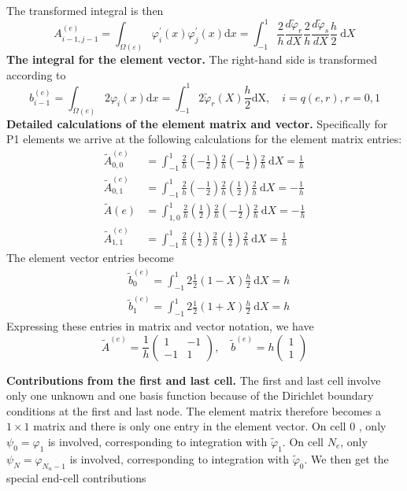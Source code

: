 \documentclass[../main.tex]{subfiles}
\begin{document}
	\noindent The transformed integral is then
	$$
	A_{i-1, j-1}^{(e)}=\int_{\Omega(\varepsilon)} \varphi_{i}^{\prime}(x) \varphi_{j}^{\prime}(x) \mathrm{d} x=\int_{-1}^{1} \frac{2}{h} \frac{d \tilde{\varphi}_{r}}{d X} \frac{2}{h} \frac{d \tilde{\varphi}_{s}}{d X} \frac{h}{2} \mathrm{~d} X
	$$
	\textbf{The integral for the element vector.  } The right-hand side is transformed according to
	$$
	b_{i-1}^{(e)}=\int_{\Omega(e)} 2 \varphi_{i}(x) \mathrm{d} x=\int_{-1}^{1} 2 \tilde{\varphi}_{r}(X) \frac{h}{2} \mathrm{dX}, \quad i=q(e, r), r=0,1
	$$
	\textbf{Detailed calculations of the element matrix and vector.   } Specifically for P1 elements we arrive at the following calculations for the element matrix entries:
	$$
	\begin{aligned}
		\tilde{A}_{0,0}^{(e)} &=\int_{-1}^{1} \frac{2}{h}\left(-\frac{1}{2}\right) \frac{2}{h}\left(-\frac{1}{2}\right) \frac{2}{h} \mathrm{~d} X=\frac{1}{h} \\
		\tilde{A}_{0,1}^{(e)} &=\int_{-1}^{1} \frac{2}{h}\left(-\frac{1}{2}\right) \frac{2}{h}\left(\frac{1}{2}\right) \frac{2}{h} \mathrm{~d} X=-\frac{1}{h} \\
		\tilde{A}(e) &=\int_{1,0}^{1} \frac{2}{h}\left(\frac{1}{2}\right) \frac{2}{h}\left(-\frac{1}{2}\right) \frac{2}{h} \mathrm{~d} X=-\frac{1}{h} \\
		\tilde{A}_{1,1}^{(e)} &=\int_{-1}^{1} \frac{2}{h}\left(\frac{1}{2}\right) \frac{2}{h}\left(\frac{1}{2}\right) \frac{2}{h} \mathrm{~d} X=\frac{1}{h}
	\end{aligned}
	$$
	The element vector entries become
	$$
	\begin{aligned}
		&\tilde{b}_{0}^{(e)}=\int_{-1}^{1} 2 \frac{1}{2}(1-X) \frac{h}{2} \mathrm{~d} X=h \\
		&\tilde{b}_{1}^{(e)}=\int_{-1}^{1} 2 \frac{1}{2}(1+X) \frac{h}{2} \mathrm{~d} X=h
	\end{aligned}
	$$
	Expressing these entries in matrix and vector notation, we have
	\begin{equation}
			\label{eqa177}
		\tilde{A}^{(e)}=\frac{1}{h}\left(\begin{array}{rr}
			1 & -1 \\
			-1 & 1
		\end{array}\right), \quad \tilde{b}^{(e)}=h\left(\begin{array}{l}
			1 \\
			1
		\end{array}\right)
	\end{equation}

	\noindent \textbf{Contributions from the first and last cell.   } The first and last cell involve only one unknown and one basis function because of the Dirichlet boundary conditions at the first and last node. The element matrix therefore becomes a $1 \times 1$ matrix and there is only one entry in the element vector. On cell 0 , only $\psi_{0}=\varphi_{1}$ is involved, corresponding to integration with $\tilde{\varphi}_{1}$. On cell $N_{e}$, only $\psi_{N}=\varphi_{N_{n}-1}$ is involved, corresponding to integration with $\tilde{\varphi}_{0}$. We then get the special end-cell contributions
	
\end{document}
